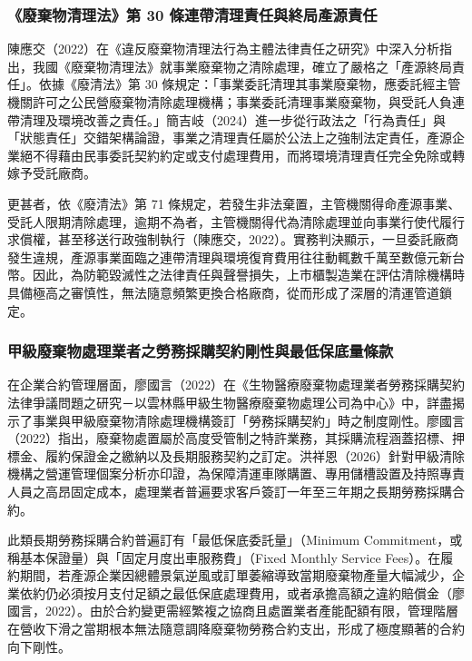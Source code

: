 \documentclass[12pt,a4paper]{article}
\begin{document}
\subsubsection{《廢棄物清理法》第 30 條連帶清理責任與終局產源責任}

陳應交（2022）在《違反廢棄物清理法行為主體法律責任之研究》中深入分析指出，我國《廢棄物清理法》就事業廢棄物之清除處理，確立了嚴格之「產源終局責任」。依據《廢清法》第 30 條規定：「事業委託清理其事業廢棄物，應委託經主管機關許可之公民營廢棄物清除處理機構；事業委託清理事業廢棄物，與受託人負連帶清理及環境改善之責任。」簡吉岐（2024）進一步從行政法之「行為責任」與「狀態責任」交錯架構論證，事業之清理責任屬於公法上之強制法定責任，產源企業絕不得藉由民事委託契約約定或支付處理費用，而將環境清理責任完全免除或轉嫁予受託廠商。

更甚者，依《廢清法》第 71 條規定，若發生非法棄置，主管機關得命產源事業、受託人限期清除處理，逾期不為者，主管機關得代為清除處理並向事業行使代履行求償權，甚至移送行政強制執行（陳應交，2022）。實務判決顯示，一旦委託廠商發生違規，產源事業面臨之連帶清理與環境復育費用往往動輒數千萬至數億元新台幣。因此，為防範毀滅性之法律責任與聲譽損失，上市櫃製造業在評估清除機構時具備極高之審慎性，無法隨意頻繁更換合格廠商，從而形成了深層的清運管道鎖定。

\subsubsection{甲級廢棄物處理業者之勞務採購契約剛性與最低保底量條款}

在企業合約管理層面，廖國言（2022）在《生物醫療廢棄物處理業者勞務採購契約法律爭議問題之研究－以雲林縣甲級生物醫療廢棄物處理公司為中心》中，詳盡揭示了事業與甲級廢棄物清除處理機構簽訂「勞務採購契約」時之制度剛性。廖國言（2022）指出，廢棄物處置屬於高度受管制之特許業務，其採購流程涵蓋招標、押標金、履約保證金之繳納以及長期服務契約之訂定。洪祥恩（2026）針對甲級清除機構之營運管理個案分析亦印證，為保障清運車隊購置、專用儲槽設置及持照專責人員之高昂固定成本，處理業者普遍要求客戶簽訂一年至三年期之長期勞務採購合約。

此類長期勞務採購合約普遍訂有「最低保底委託量」（Minimum Commitment，或稱基本保證量）與「固定月度出車服務費」（Fixed Monthly Service Fees）。在履約期間，若產源企業因總體景氣逆風或訂單萎縮導致當期廢棄物產量大幅減少，企業依約仍必須按月支付足額之最低保底處理費用，或者承擔高額之違約賠償金（廖國言，2022）。由於合約變更需經繁複之協商且處置業者產能配額有限，管理階層在營收下滑之當期根本無法隨意調降廢棄物勞務合約支出，形成了極度顯著的合約向下剛性。
\end{document}
